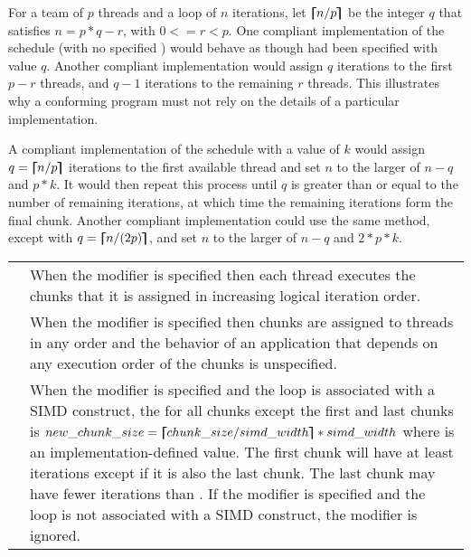 \begin{note}
For a team of $p$ threads and a loop of $n$ iterations, let $\bm{\lceil\mkern-10mu\lceil} n/p \bm{\rceil\mkern-10mu\rceil}$ be the integer $q$
that satisfies $n = p*q - r$, with $0 <= r < p$. One compliant implementation of the 
schedule (with no specified ) would behave as though  had been
specified with value $q$. Another compliant implementation would assign $q$ iterations to
the first $p-r$ threads, and $q-1$ iterations to the remaining $r$ threads. This illustrates why a
conforming program must not rely on the details of a particular implementation.

A compliant implementation of the  schedule with a  value of $k$
would assign $q = \bm{\lceil\mkern-10mu\lceil} n/p \bm{\rceil\mkern-10mu\rceil}$ iterations to the first available thread and set $n$ to the larger of
$n-q$ and $p*k$. It would then repeat this process until $q$ is greater than or equal to the
number of remaining iterations, at which time the remaining iterations form the final
chunk. Another compliant implementation could use the same method, except with
$q = \bm{\lceil\mkern-10mu\lceil} n/(2p) \bm{\rceil\mkern-10mu\rceil}$, and set $n$ to the larger of $n-q$ and $2*p*k$.
\end{note}

\nolinenumbers
\vspace{1ex}\renewcommand{\arraystretch}{1.5}
\tablefirsthead{%
\hline\\[-3ex]
}
\tablelasttail{\hline}
\begin{supertabular}{ p{1in} p{4.1in} }
{} & When the {} modifier is specified then each thread executes the chunks
that it is assigned in increasing logical iteration order.\\
{} & When the {} modifier is specified then chunks are assigned to threads
in any order and the behavior of an application that depends on any execution order of the chunks is unspecified.\\
{} & When the {} modifier is specified and the loop is associated with a SIMD construct, the {} for all chunks except the first and last chunks  is  $new\_chunk\_size = \bm{\lceil\mkern-10mu\lceil} chunk\_size / simd\_width \bm{\rceil\mkern-10mu\rceil} * simd\_width $ where {} is an implementation-defined value. The first chunk will have at least {} iterations except if it is also the last chunk. The last chunk may have fewer iterations than {}. If the {} modifier is specified and the loop is not associated  with a SIMD construct, the modifier is ignored.\\
\end{supertabular}
\linenumbers
\medskip


